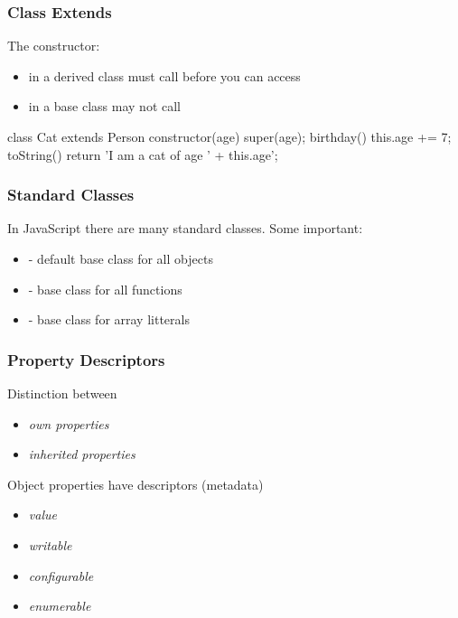 \begin{frame}[fragile] \frametitle{Class Extends}
The constructor:
\begin{itemize}
  \item in a derived class must call  before you can access 
  \item in a base class may not call 
\end{itemize}
\begin{CodeBox}{}
class Cat extends Person {
  constructor(age) {
    super(age);
  }
  birthday() {
    this.age += 7;
  }
  toString() {
    return 'I am a cat of age ' + this.age';
  }
}
\end{CodeBox}
\end{frame}

\begin{frame}[fragile] \frametitle{Standard Classes}
In JavaScript there are many standard classes. Some important: 
\begin{itemize}
  \item {} - default base class for all objects
  \item {} - base class for all functions
  \item {} - base class for array litterals
\end{itemize}
\end{frame}

\begin{frame}[fragile] \frametitle{Property Descriptors}
Distinction between
\begin{itemize}
  \item \emph{own properties}
  \item \emph{inherited properties}
\end{itemize}

Object properties have descriptors (metadata)
\begin{itemize}
  \item \emph{value}
  \item \emph{writable}
  \item \emph{configurable}
  \item \emph{enumerable}
\end{itemize}
\end{frame}

